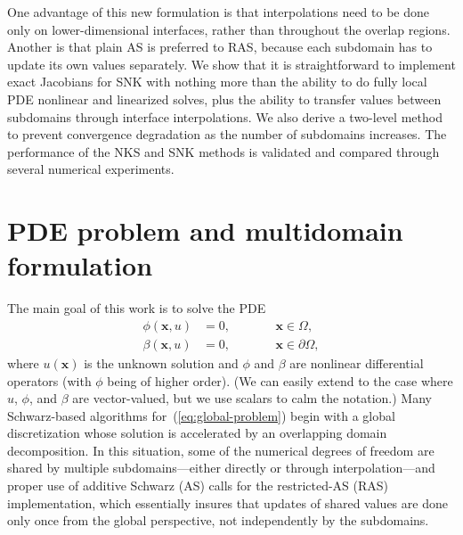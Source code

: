 One advantage of this new formulation is that interpolations need to be done only on lower-dimensional interfaces, rather than throughout the overlap regions. Another is that plain AS is preferred to RAS, because each subdomain has to update its own values separately. We show that it is straightforward to implement exact Jacobians for SNK with nothing more than the ability to do fully local PDE nonlinear and linearized solves, plus the ability to transfer values between subdomains through interface interpolations. We also derive a two-level method to prevent convergence degradation as the number of subdomains increases. The performance of the NKS and SNK methods is validated and compared through several numerical experiments. 


\section{PDE problem and multidomain formulation}
\label{sec:pde}

The main goal of this work is to solve the PDE
\begin{subequations}
  \label{eq:global-problem}
  \begin{alignat}{2}
    \label{eq:pde}
    \phi(\bm{x},u) &= 0, & \qquad & \bm{x}\in\Omega, \\
    \label{eq:bc}
    \beta(\bm{x},u) &= 0, & \qquad & \bm{x}\in\partial\Omega,
  \end{alignat}  
\end{subequations}
where $u(\bm{x})$ is the unknown solution and $\phi$ and $\beta$ are nonlinear differential operators (with $\phi$ being of higher order). (We can easily extend to the case where $u$, $\phi$, and $\beta$ are vector-valued, but we use scalars to calm the notation.) Many Schwarz-based algorithms for~(\ref{eq:global-problem}) begin with a global discretization whose solution is accelerated by an overlapping domain decomposition. In this situation, some of the numerical degrees of freedom are shared by multiple subdomains---either directly or through interpolation---and proper use of additive Schwarz (AS) calls for the restricted-AS (RAS) implementation, which essentially insures that updates of shared values are done only once from the global perspective, not independently by the subdomains.

